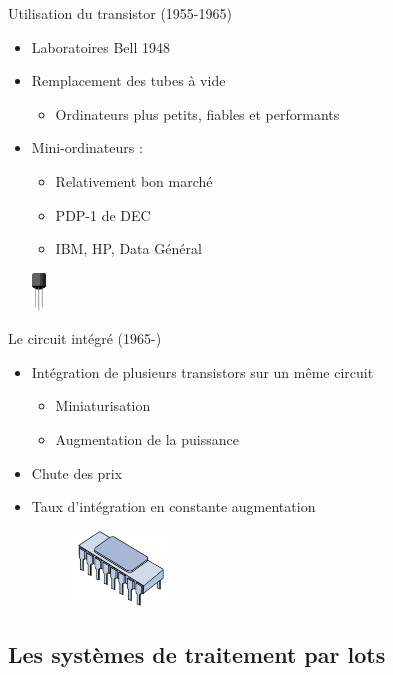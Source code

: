 \begin{frame}{Utilisation du transistor (1955-1965)}
\begin{itemize}
\item Laboratoires Bell 1948
\item Remplacement des tubes à vide
\begin{itemize}
\item Ordinateurs plus petits, fiables et performants
\end{itemize}
\item Mini-ordinateurs :
\begin{itemize}
\item Relativement bon marché
\item PDP-1 de DEC
\item IBM, HP, Data Général
\end{itemize}
	\begin{center}
	\includegraphics[height=1cm,bb=0 0 95 257]{../illustration/transistor.png}
	\end{center}
\end{itemize}
\end{frame}

\begin{frame}{Le circuit intégré (1965-)}
\begin{itemize}
\item Intégration de plusieurs transistors sur un même circuit
\begin{itemize}
\item Miniaturisation
\item Augmentation de la puissance
\end{itemize}
\item Chute des prix
\item Taux d'intégration en constante augmentation
\begin{figure}[tr]
	\includegraphics[height=2cm]{../illustration/circuit_integre.png}
\end{figure}
\end{itemize}
\end{frame}


\subsection{Les systèmes de traitement par lots}

